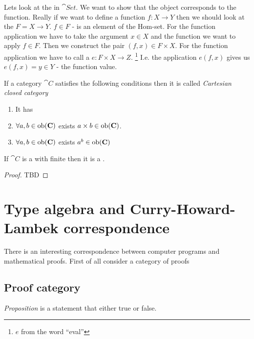 \begin{example}
\label{ex:exponential_set}
Lets look at the  in $\cat{Set}$. We want
to show that the object corresponds to the function. Really if we want
to define a function $f: X \to Y$ then we should look at the
 $F = X \to Y$. $f \in F$ - is an element of the
Hom-set. For the function application we have to take the argument $x
\in X$ and the function we want to apply $f \in F$. Then we construct
the pair $(f,x) \in F \times X$. For the function application we have
to call a  $e: F \times X \to Z$.
\footnote{$e$ from the word ``eval''}
I.e. the
application $e(f, x)$ gives us $e(f, x) = y \in Y$ - the function
value. 
\end{example}

\begin{definition}
\label{def:cartesian_closed_category}
If a category $\cat{C}$ satisfies the following conditions then it is
called \textit{Cartesian closed category}
\begin{enumerate}
\item It has 
\item $\forall a,b \in \mathrm{ob}(\mathbf{C})$ exists  $a
  \times b \in \mathrm{ob}(\mathbf{C})$.
\item $\forall a,b \in \mathrm{ob}(\mathbf{C})$ exists 
  $a^b \in \mathrm{ob}(\mathbf{C})$
\end{enumerate}
\end{definition}

\begin{theorem}
\label{thm:ccc}
If $\cat{C}$ is a  with
finite  then it is a
.
\begin{proof}
TBD
\end{proof}
\end{theorem}

\section{Type algebra and Curry-Howard-Lambek correspondence}
\label{sec:curry_howard_lambek}
There is an interesting correspondence between computer programs and
mathematical proofs. First of all consider a category of proofs
\subsection{\textbf{Proof} category}
\begin{definition}[Proposition]
\label{def:proposition}
\textit{Proposition} is a statement that either true or false.
\end{definition}

